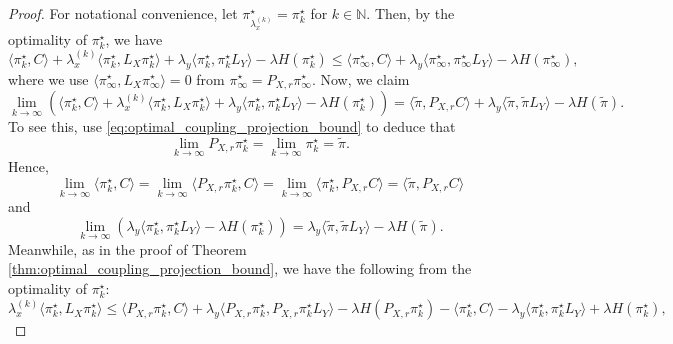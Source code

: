\documentclass[10pt,a4paper]{amsart}
\newcommand{\N}{\mathbb{N}}
\begin{document}
\begin{proof}
    For notational convenience, let $\pi^\star_{\lambda_x^{(k)}} = \pi^\star_k$ for $k \in \N$. Then, by the optimality of $\pi^\star_k$, we have
    \begin{equation}
        \label{eq:optimality_limit}
        \langle \pi^\star_k, C \rangle + \lambda_x^{(k)} \langle \pi^\star_k, L_X \pi^\star_k \rangle + \lambda_y \langle \pi^\star_k, \pi^\star_k L_Y \rangle - \lambda H(\pi^\star_k) \le \langle \pi^\star_\infty, C \rangle + \lambda_y \langle \pi^\star_\infty, \pi^\star_\infty L_Y \rangle - \lambda H(\pi^\star_\infty),
    \end{equation}
    where we use $\langle \pi^\star_\infty, L_X \pi^\star_\infty \rangle = 0$ from $\pi^\star_\infty = P_{X, r} \pi^\star_\infty$. Now, we claim 
    \begin{equation}
        \label{eq:limit_objective}
        \lim_{k \to \infty} \left(\langle \pi^\star_k, C \rangle + \lambda_x^{(k)} \langle \pi^\star_k, L_X \pi^\star_k \rangle + \lambda_y \langle \pi^\star_k, \pi^\star_k L_Y \rangle - \lambda H(\pi^\star_k)\right) = \langle \tilde{\pi}, P_{X, r} C \rangle + \lambda_y \langle \tilde{\pi}, \tilde{\pi} L_Y \rangle - \lambda H(\tilde{\pi}).
    \end{equation}
    To see this, use \eqref{eq:optimal_coupling_projection_bound} to deduce that 
    \begin{equation*}
        \lim_{k \to \infty} P_{X, r} \pi^\star_k = \lim_{k \to \infty} \pi^\star_k = \tilde{\pi}.
    \end{equation*}
    Hence, 
    \begin{equation}
        \label{eq:limit_temp1}
        \lim_{k \to \infty} \langle \pi^\star_k, C \rangle = \lim_{k \to \infty} \langle P_{X, r} \pi^\star_k, C \rangle = \lim_{k \to \infty} \langle \pi^\star_k, P_{X, r} C \rangle = \langle \tilde{\pi}, P_{X, r} C \rangle
    \end{equation}
    and
    \begin{equation}
        \label{eq:limit_temp2}
        \lim_{k \to \infty} \left(\lambda_y \langle \pi^\star_k, \pi^\star_k L_Y \rangle - \lambda H(\pi^\star_k)\right) = \lambda_y \langle \tilde{\pi}, \tilde{\pi} L_Y \rangle - \lambda H(\tilde{\pi}).
    \end{equation}
    Meanwhile, as in the proof of Theorem \ref{thm:optimal_coupling_projection_bound}, we have the following from the optimality of $\pi^\star_k$:
    \begin{equation*}
        \lambda_x^{(k)} \langle \pi^\star_k, L_X \pi^\star_k \rangle \le \langle P_{X, r} \pi^\star_k, C \rangle + \lambda_y \langle P_{X, r} \pi^\star_k, P_{X, r} \pi^\star_k L_Y \rangle - \lambda H(P_{X, r} \pi^\star_k) - \langle \pi^\star_k, C \rangle - \lambda_y \langle \pi^\star_k, \pi^\star_k L_Y \rangle + \lambda H(\pi^\star_k),

\end{equation*}
\end{proof}
\end{document}
